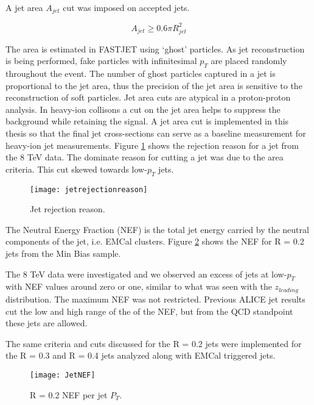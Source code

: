 A jet area $A_{jet}$ cut was imposed on accepted jets.

\begin{equation}
A_{jet} \geq 0.6 \pi R_{jet}^{2}
\label{eq:AreaJet}
\end{equation}

\noindent
The area is estimated in FASTJET using `ghost' particles.  As jet reconstruction is being performed, fake particles with infinitesimal $p_{T}$ are placed randomly throughout the event.  The number of ghost particles captured in a jet is proportional to the jet area, thus the precision of the jet area is sensitive to the reconstruction of soft particles.  Jet area cuts are atypical in a proton-proton analysis.  In heavy-ion collisons a cut on the jet area helps to suppress the background while retaining the signal.  A jet area cut is implemented in this thesis so that the final jet cross-sections can serve as a baseline measurement for heavy-ion jet measurements.  Figure \ref{fig:jetRejection} shows the rejection reason for a jet from the 8 TeV data.  The dominate reason for cutting a jet was due to the area criteria.  This cut skewed towards low-$p_{T}$ jets. 

\begin{figure}[h]
\texttt{[image: jetrejectionreason]}
\centering
\caption{Jet rejection reason.}
\label{fig:jetRejection}
\end{figure}


The Neutral Energy Fraction (NEF) is the total jet energy carried by the neutral components of the jet, i.e. EMCal clusters.  Figure \ref{fig:JetNEF} shows the NEF for R = 0.2 jets from the Min Bias sample.

The 8 TeV data were investigated and we observed an excess of jets at low-$p_{T}$ with NEF values around zero or one, similar to what was seen with the $z_{leading}$ distribution.  The maximum NEF was not restricted.  Previous ALICE jet results cut the low and high range of the of the NEF, but from the QCD standpoint these jets are allowed.

The same criteria and cuts discussed for the R = 0.2 jets were implemented for the R = 0.3 and R = 0.4 jets analyzed along with EMCal triggered jets.

\begin{figure}[h]
\texttt{[image: JetNEF]}
\centering
\caption{R = 0.2 NEF per jet $P_{T}$.}
\label{fig:JetNEF}
\end{figure}





